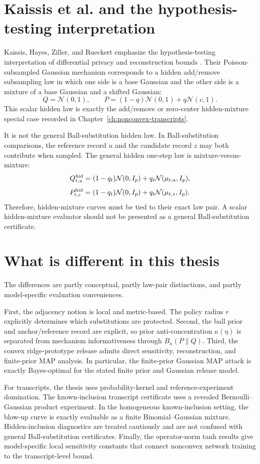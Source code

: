 \documentclass[11pt,a4paper]{report}
\theoremstyle{plain}
\theoremstyle{definition}
\theoremstyle{remark}
\newcommand{\N}{\mathcal{N}}
\begin{document}
\section{Kaissis et al. and the hypothesis-testing interpretation}
\label{sec:compare-kaissis}

Kaissis, Hayes, Ziller, and Rueckert emphasize the hypothesis-testing interpretation of differential privacy and reconstruction bounds \cite{kaissis2023rero}.  Their Poisson-subsampled Gaussian mechanism corresponds to a hidden add/remove subsampling law in which one side is a base Gaussian and the other side is a mixture of a base Gaussian and a shifted Gaussian:
\[
Q=\N(0,1),
\qquad
P=(1-q)\N(0,1)+q\N(c,1).
\]
This scalar hidden law is exactly the add/remove or zero-center hidden-mixture special case recorded in Chapter~\ref{ch:nonconvex-transcripts}.

It is not the general Ball-substitution hidden law.  In Ball-substitution comparisons, the reference record $u$ and the candidate record $z$ may both contribute when sampled.  The general hidden one-step law is mixture-versus-mixture:
\[
Q_{t,u}^{\rm hid}
=
(1-q_t)\N(0,I_p)+q_t\N(\mu_{t,u},I_p),
\]
\[
P_{t,z}^{\rm hid}
=
(1-q_t)\N(0,I_p)+q_t\N(\mu_{t,z},I_p).
\]
Therefore, hidden-mixture curves must be tied to their exact law pair.  A scalar hidden-mixture evaluator should not be presented as a general Ball-substitution certificate.

\section{What is different in this thesis}
\label{sec:what-is-different}

The differences are partly conceptual, partly law-pair distinctions, and partly model-specific evaluation conveniences.

First, the adjacency notion is local and metric-based.  The policy radius $r$ explicitly determines which substitutions are protected.  Second, the ball prior and anchor/reference record are explicit, so prior anti-concentration $\kappa(\eta)$ is separated from mechanism informativeness through $B_\kappa(P\|Q)$.  Third, the convex ridge-prototype release admits direct sensitivity, reconstruction, and finite-prior MAP analysis.  In particular, the finite-prior Gaussian MAP attack is exactly Bayes-optimal for the stated finite prior and Gaussian release model.

For transcripts, the thesis uses probability-kernel and reference-experiment domination.  The known-inclusion transcript certificate uses a revealed Bernoulli--Gaussian product experiment.  In the homogeneous known-inclusion setting, the blow-up curve is exactly evaluable as a finite Binomial--Gaussian mixture.  Hidden-inclusion diagnostics are treated cautiously and are not confused with general Ball-substitution certificates.  Finally, the operator-norm tanh results give model-specific local sensitivity constants that connect nonconvex network training to the transcript-level bound.
\end{document}
